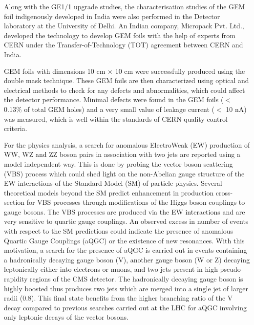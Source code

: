 Along with the GE1/1 upgrade studies, the characterisation studies of the GEM foil indigenously developed in India were also performed in the Detector laboratory at the University of Delhi. An Indian company, Micropack Pvt. Ltd., developed the technology to develop GEM foils with the help of experts from CERN under the Transfer-of-Technology (TOT) agreement between CERN and India.

GEM foils with dimensions 10 cm $\times$ 10 cm were successfully produced using the double mask technique. These GEM foils are then characterized using optical and electrical methods to check for any defects and abnormalities, which could affect the detector performance. Minimal defects were found in the GEM foils ($<$ 0.13\% of total GEM holes) and a very small value of leakage current ($<$ 10 nA) was measured, which is well within the standards of CERN quality control criteria.

For the physics analysis, a search for anomalous ElectroWeak (EW) production of WW, WZ and ZZ boson pairs in association with two jets are reported using a model independent way. This is done by probing the vector boson scattering (VBS) process which could shed light on the non-Abelian gauge structure of the EW interactions of the Standard Model (SM) of particle physics. Several theoretical models beyond the SM predict enhancement in production cross-section for VBS processes through modifications of the Higgs boson couplings to gauge bosons. The VBS processes are produced via the EW interactions and are very sensitive to quartic gauge couplings. An observed excess in number of events with respect to the SM predictions could indicate the presence of anomalous Quartic Gauge Couplings (aQGC) or the existence of new resonances. With this motivation, a search for the presence of aQGC is carried out in events containing a hadronically decaying gauge boson (V), another gauge boson (W or Z) decaying leptonically either into electrons or muons, and two jets present in high pseudo-rapidity regions of the CMS detector. The hadronically decaying gauge boson is highly boosted thus produces two jets which are merged into a single jet of larger radii (0.8). This final state benefits from the higher branching ratio of the V decay compared to previous searches carried out at the LHC for aQGC involving only leptonic decays of the vector bosons.

